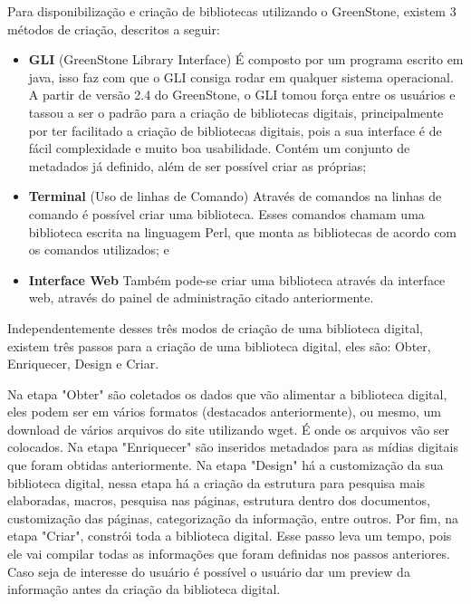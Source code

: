 Para disponibilização e criação de bibliotecas utilizando o GreenStone, existem 3 métodos de criação, descritos a seguir:

\begin{itemize}
  \item \textbf{GLI} (GreenStone Library Interface) É composto por um programa escrito em java, isso faz com que o GLI consiga rodar em qualquer sistema operacional.  A partir de versão 2.4 do GreenStone, o GLI tomou força entre os usuários e tassou a ser o padrão para a criação de bibliotecas digitais, principalmente por ter facilitado a criação de bibliotecas digitais, pois a sua interface é de fácil complexidade e muito boa usabilidade. Contém um conjunto de metadados já definido, além de ser possível criar as próprias;
  \item \textbf{Terminal} (Uso de linhas de Comando) Através de comandos na linhas de comando é possível criar uma biblioteca. Esses comandos chamam uma biblioteca escrita na linguagem Perl, que monta as bibliotecas de acordo com os comandos utilizados; e
  \item \textbf{Interface Web} Também pode-se criar uma biblioteca através da interface web, através do painel de administração citado anteriormente.
\end{itemize}

Independentemente desses três modos de criação de uma biblioteca digital, existem três passos para a criação de uma biblioteca digital, eles são: Obter, Enriquecer, Design e Criar.

Na etapa "Obter" são coletados os dados que vão alimentar a biblioteca digital, eles podem ser em vários formatos (destacados anteriormente), ou mesmo, um download de vários arquivos do site utilizando wget. É onde os arquivos vão ser colocados. Na etapa "Enriquecer" são inseridos metadados para as mídias digitais que foram obtidas anteriormente. Na etapa "Design" há a customização da sua biblioteca digital, nessa etapa há a criação da estrutura para pesquisa mais elaboradas, macros, pesquisa nas páginas, estrutura dentro dos documentos, customização das páginas, categorização da informação, entre outros. Por fim, na etapa "Criar", constrói toda a biblioteca digital. Esse passo leva um tempo, pois ele vai compilar todas as informações que foram definidas nos passos anteriores. Caso seja de interesse do usuário é possível o usuário dar um preview da informação antes da criação da biblioteca digital.

